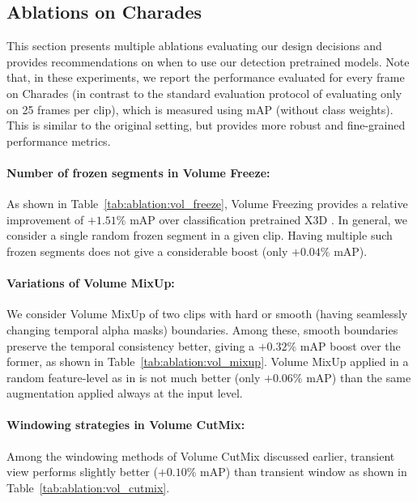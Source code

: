 \documentclass[10pt,twocolumn,letterpaper]{article}
\newcommand{\tref}[1]{Table~\ref{#1}}
\begin{document}
\vspace{-1mm}
\subsection{Ablations on Charades}
\label{subsubsec:ablations}

This section presents multiple ablations evaluating our design decisions and provides recommendations on when to use our detection pretrained models. Note that, in these experiments, we report the performance evaluated for every frame on Charades \cite{sigurdsson2016hollywood} (in contrast to the standard evaluation protocol of evaluating only on 25 frames per clip), which is measured using mAP (without class weights). This is similar to the original setting, but provides more robust and fine-grained performance metrics.

\vspace{-1mm}
\paragraph{Number of frozen segments in Volume Freeze:} As shown in \tref{tab:ablation:vol_freeze}, Volume Freezing provides a relative improvement of $+1.51\%$ mAP over classification pretrained X3D \cite{feichtenhofer2020x3d}. In general, we consider a single random frozen segment in a given clip. Having multiple such frozen segments does not give a considerable boost (only  $+0.04\%$ mAP).

\vspace{-1mm}
\paragraph{Variations of Volume MixUp:} We consider Volume MixUp of two clips with hard or smooth (having seamlessly changing temporal alpha masks) boundaries. Among these, smooth boundaries preserve the temporal consistency better, giving a $+0.32\%$ mAP boost over the former, as shown in \tref{tab:ablation:vol_mixup}. Volume MixUp applied in a random feature-level as in \cite{verma2019manifold} is not much better (only  $+0.06\%$ mAP) than the same augmentation applied always at the input level.

\vspace{-1mm}
\paragraph{Windowing strategies in Volume CutMix:} Among the windowing methods of Volume CutMix discussed earlier, transient view performs slightly better ($+0.10\%$ mAP) than transient window as shown in \tref{tab:ablation:vol_cutmix}.
\end{document}
